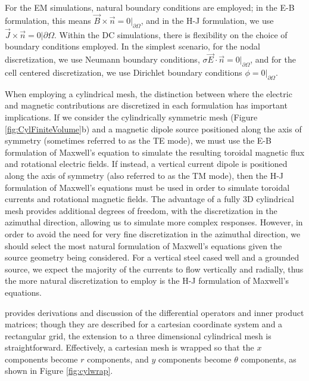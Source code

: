 For the EM simulations, natural boundary conditions are employed; in the E-B formulation, this means $\vec{B}\times\vec{n} = 0\vert_{\partial \Omega}$, and in the H-J formulation, we use $\vec{J}\times\vec{n} = 0\vert{\partial \Omega}$. Within the DC simulations, there is flexibility on the choice of boundary conditions employed. In the simplest scenario, for the nodal discretization, we use Neumann boundary conditions, $\sigma\vec{E} \cdot \vec{n} = 0\vert_{\partial \Omega}$, and for the cell centered discretization, we use Dirichlet boundary conditions $\phi = 0\vert_{\partial \Omega}$.

When employing a cylindrical mesh, the distinction between where the electric and magnetic contributions are discretized in each formulation has important implications. If we consider the cylindrically symmetric mesh (Figure \ref{fig:CylFiniteVolume}b) and a magnetic dipole source positioned along the axis of symmetry (sometimes referred to as the TE mode), we must use the E-B formulation of Maxwell's equation to simulate the resulting toroidal magnetic flux and rotational electric fields. If instead, a vertical current dipole is positioned along the axis of symmetry (also referred to as the TM mode), then the H-J formulation of Maxwell's equations must be used in order to simulate toroidal currents and rotational magnetic fields. The advantage of a fully 3D cylindrical mesh provides additional degrees of freedom, with the discretization in the azimuthal direction, allowing us to simulate more complex responses. However, in order to avoid the need for very fine discretization in the azimuthal direction, we should select the most natural formulation of Maxwell's equations given the source geometry being considered. For a vertical steel cased well and a grounded source, we expect the majority of the currents to flow vertically and radially, thus the more natural discretization to employ is the H-J formulation of Maxwell's equations.

\cite{Haber2014} provides derivations and discussion of the differential operators and inner product matrices; though they are described for a cartesian coordinate system and a rectangular grid, the extension to a three dimensional cylindrical mesh is straightforward. Effectively, a cartesian mesh is wrapped so that the $x$ components become $r$ components, and $y$ components become $\theta$ components, as shown in Figure \ref{fig:cylwrap}.




